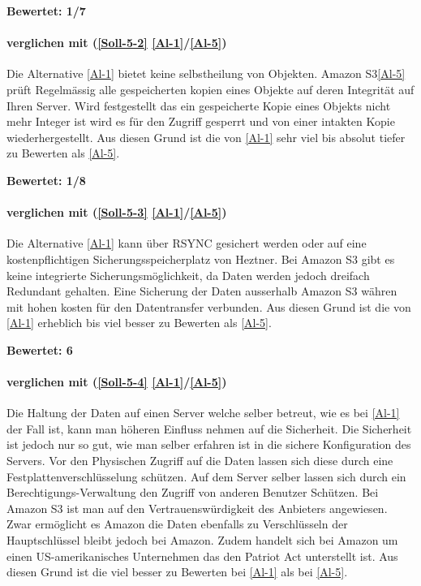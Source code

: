 \textbf{Bewertet: 1/7}


\paragraph*{  verglichen mit  (\ref{Soll-5-2} \ref{Al-1}/\ref{Al-5})} 
Die Alternative \ref{Al-1} bietet keine selbstheilung von Objekten. Amazon S3\ref{Al-5} prüft Regelmässig alle gespeicherten kopien eines Objekte auf deren Integrität auf Ihren Server. Wird festgestellt das ein gespeicherte Kopie eines Objekts nicht mehr Integer ist wird es für den Zugriff gesperrt und von einer intakten Kopie wiederhergestellt. Aus diesen Grund ist die  von \ref{Al-1} sehr viel bis absolut tiefer zu Bewerten als \ref{Al-5}.

\textbf{Bewertet: 1/8}

\paragraph*{  verglichen mit  (\ref{Soll-5-3} \ref{Al-1}/\ref{Al-5})} 
Die Alternative \ref{Al-1} kann über RSYNC gesichert werden oder auf eine kostenpflichtigen Sicherungsspeicherplatz von Heztner. Bei Amazon S3 gibt es keine integrierte Sicherungsmöglichkeit, da Daten werden jedoch dreifach Redundant gehalten. Eine Sicherung der Daten ausserhalb Amazon S3 währen mit hohen kosten für den Datentransfer verbunden. Aus diesen Grund ist die  von \ref{Al-1} erheblich bis viel besser zu Bewerten als \ref{Al-5}.

\textbf{Bewertet: 6}

\paragraph*{  verglichen mit  (\ref{Soll-5-4} \ref{Al-1}/\ref{Al-5})} 
Die Haltung der Daten auf einen Server welche selber betreut, wie es bei \ref{Al-1} der Fall ist, kann man höheren Einfluss nehmen auf die Sicherheit. Die Sicherheit ist jedoch nur so gut, wie man selber erfahren ist in die sichere Konfiguration des Servers. Vor den Physischen Zugriff auf die Daten lassen sich diese durch eine Festplattenverschlüsselung schützen. Auf dem Server selber lassen sich durch ein Berechtigungs-Verwaltung den Zugriff von anderen Benutzer Schützen. Bei Amazon S3 ist man auf den Vertrauenswürdigkeit des Anbieters angewiesen. Zwar ermöglicht es Amazon die Daten ebenfalls zu Verschlüsseln der Hauptschlüssel bleibt jedoch bei Amazon. Zudem handelt sich bei Amazon um einen US-amerikanisches Unternehmen das den Patriot Act unterstellt ist.
Aus diesen Grund ist die  viel besser zu Bewerten bei \ref{Al-1} als bei \ref{Al-5}.

